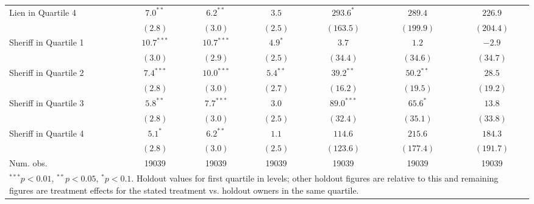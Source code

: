 \documentclass[12pt]{article}
\begin{document}
\begin{table}[htbp]
\begin{center}
\begin{tabular}{l c c c c c c }
Lien in Quartile 4    & $7.0^{**}$    & $6.2^{**}$    & $3.5$        & $293.6^{*}$   & $289.4$        & $226.9$        \\
                      & $(2.8)$       & $(3.0)$       & $(2.5)$      & $(163.5)$     & $(199.9)$      & $(204.4)$      \\
Sheriff in Quartile 1 & $10.7^{***}$  & $10.7^{***}$  & $4.9^{*}$    & $3.7$         & $1.2$          & $-2.9$         \\
                      & $(3.0)$       & $(2.9)$       & $(2.5)$      & $(34.4)$      & $(34.6)$       & $(34.7)$       \\
Sheriff in Quartile 2 & $7.4^{***}$   & $10.0^{***}$  & $5.4^{**}$   & $39.2^{**}$   & $50.2^{**}$    & $28.5$         \\
                      & $(2.8)$       & $(3.0)$       & $(2.7)$      & $(16.2)$      & $(19.5)$       & $(19.2)$       \\
Sheriff in Quartile 3 & $5.8^{**}$    & $7.7^{***}$   & $3.0$        & $89.0^{***}$  & $65.6^{*}$     & $13.8$         \\
                      & $(2.8)$       & $(3.0)$       & $(2.5)$      & $(32.4)$      & $(35.1)$       & $(33.8)$       \\
Sheriff in Quartile 4 & $5.1^{*}$     & $6.2^{**}$    & $1.1$        & $114.6$       & $215.6$        & $184.3$        \\
                      & $(2.8)$       & $(3.0)$       & $(2.5)$      & $(123.6)$     & $(177.4)$      & $(191.7)$      \\
\hline
Num. obs.             & 19039         & 19039         & 19039        & 19039         & 19039          & 19039          \\
\hline
\multicolumn{7}{l}{\scriptsize{\parbox{.75\linewidth}{$^{***}p<0.01$, $^{**}p<0.05$, $^*p<0.1$. Holdout values for first quartile in levels; other holdout figures are relative to this and remaining figures are treatment effects for the stated treatment vs. holdout owners in the same quartile.}}}
\end{tabular}
\label{lpm_hetero}
\end{center}
\end{table}
\end{document}
